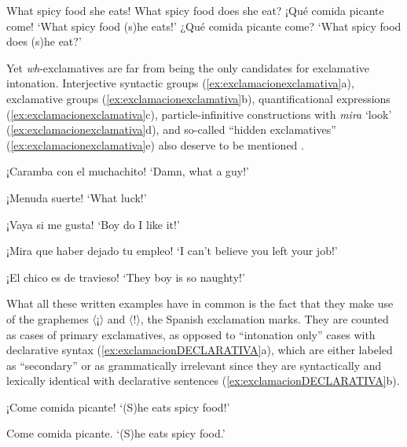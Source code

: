 \begin{exe} 
\ex \label{ex:exclamativaWH}
\begin{xlist}
	
	\ex What spicy food she eats!
	\ex What spicy food does she eat?
	\ex ¡Qué comida picante come!
		\glt `What spicy food (s)he eats!'
	\ex ¿Qué comida picante come?
		\glt `What spicy food does (s)he eat?'
\end{xlist}
\end{exe}

Yet \textit{wh}-exclamatives are far from being the only candidates for 
exclamative intonation. Interjective syntactic groups 
(\ref{ex:exclamacionexclamativa}a), exclamative groups 
(\ref{ex:exclamacionexclamativa}b), quantificational expressions 
(\ref{ex:exclamacionexclamativa}c), particle-infinitive 
constructions with \textit{mira} `look' 
(\ref{ex:exclamacionexclamativa}d), and so-called ``hidden 
exclamatives'' (\ref{ex:exclamacionexclamativa}e) also deserve to be 
mentioned \parencites[5]{Bosque.2017}[811]{RealAcademiaEspanola.2010}[144]{Villalba.2017}.

\begin{exe} 
\ex \label{ex:exclamacionexclamativa}
\begin{xlist}
	\ex ¡Caramba con el muchachito! 
	\glt `Damn, what a guy!'
	
	\ex ¡Menuda suerte!
	\glt `What luck!' 
	
	\ex ¡Vaya si me gusta!
	\glt `Boy do I like it!'
	
	\ex ¡Mira que haber dejado tu empleo! 
	\glt `I can't believe you left your job!'
	
	\ex ¡El chico es de travieso! 
	\glt `They boy is so naughty!' 
\end{xlist}
\end{exe}

What all these written examples have in common is the fact that they make use of the graphemes 〈¡〉 and 〈!〉, the Spanish exclamation marks. They are 
counted as cases of primary exclamatives, as opposed to ``intonation only'' 
cases with declarative syntax (\ref{ex:exclamacionDECLARATIVA}a), which 
are either labeled as ``secondary'' \citep[7]{Bosque.2017} or as 
grammatically irrelevant \citep{Olbertz.2012} since they are syntactically 
and lexically identical with declarative sentences 
(\ref{ex:exclamacionDECLARATIVA}b).

\begin{exe} 
	\ex \label{ex:exclamacionDECLARATIVA}
	\begin{xlist}
	\ex ¡Come comida picante!
	\glt `(S)he eats spicy food!'
	
	\ex Come comida picante.
	\glt `(S)he eats spicy food.'
	\end{xlist}
\end{exe}

